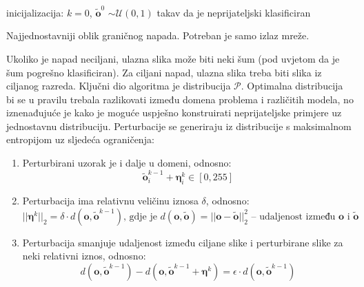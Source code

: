 \documentclass[utf8, diplomski]{fer}
\begin{document}
\begin{center}
\begin{algorithm}[H]
 inicijalizacija: $k=0$, $\boldsymbol{\tilde{o}}^{0}$ $\sim \mathcal{U}(0, 1)$ takav da je neprijateljski klasificiran\;
 \caption{Najjednostavniji oblik graničnog napada. Potreban je samo izlaz mreže.}\label{simple_boundary_alg}
\end{algorithm}
\end{center}
\par
Ukoliko je napad neciljani, ulazna slika može biti neki šum (pod uvjetom da je šum pogrešno klasificiran). Za ciljani napad, ulazna slika treba biti slika iz ciljanog razreda. Ključni dio algoritma je distribucija $\mathcal{P}$. Optimalna distribucija bi se u pravilu trebala razlikovati između domena problema i različitih modela, no iznenađujuće je kako je moguće uspješno konstruirati neprijateljske primjere uz jednostavnu distribuciju. Perturbacije se generiraju iz distribucije s maksimalnom entropijom uz sljedeća ograničenja:
\begin{enumerate}
  \item Perturbirani uzorak je i dalje u domeni, odnosno:
  \begin{equation}\label{boundary_1_cond}
	\boldsymbol{\tilde{o}}_{i}^{k-1} + \boldsymbol{\eta}_{i}^{k} \in [0, 255]
	\end{equation}
  \item Perturbacija ima relativnu veličinu iznosa $\delta$, odnosno:
    \begin{equation}\label{boundary_2_cond}
	||\boldsymbol{\eta}^{k}||_{2} = \delta \cdot d(\boldsymbol{o}, \boldsymbol{\tilde{o}}^{k-1})\text{, gdje je }d(\boldsymbol{o}, \boldsymbol{\tilde{o}}) = ||\boldsymbol{o} - \boldsymbol{\tilde{o}}||_{2}^{2} \text{ -- udaljenost između }\boldsymbol{o}\text{ i } \boldsymbol{\tilde{o}}
	\end{equation}
	\item Perturbacija smanjuje udaljenost između ciljane slike i perturbirane slike za neki relativni iznos, odnosno:
    \begin{equation}\label{boundary_3_cond}
	d(\boldsymbol{o}, \boldsymbol{\tilde{o}}^{k-1}) - d(\boldsymbol{o}, \boldsymbol{\tilde{o}}^{k-1} + \boldsymbol{\eta}^{k}) = \epsilon \cdot d(\boldsymbol{o}, \boldsymbol{\tilde{o}}^{k-1})
	\end{equation}
\end{enumerate}
\end{document}
